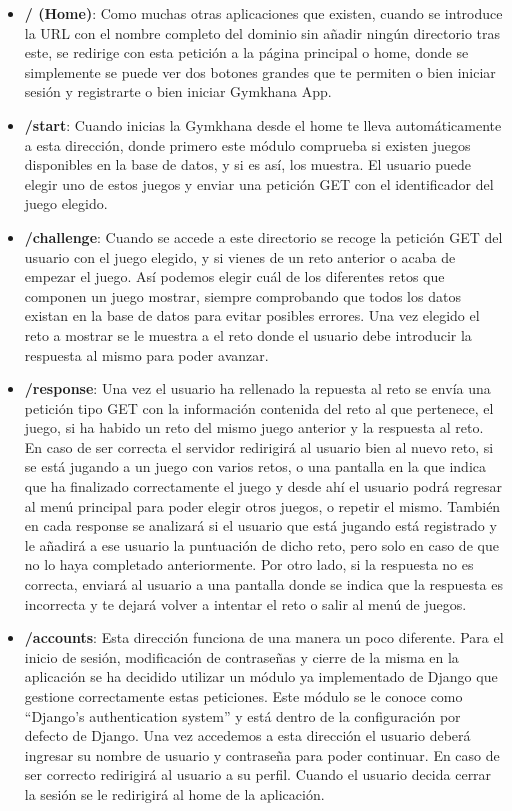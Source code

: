 \documentclass[a4paper, 12pt]{book}
\begin{document}
\begin{itemize}
	\item \textbf {/ (Home)}: Como muchas otras aplicaciones que existen, cuando se introduce la URL con el nombre completo del dominio sin añadir ningún directorio tras este, se redirige con esta petición a la página principal o home, donde se simplemente se puede ver dos botones grandes que te permiten o bien iniciar sesión y registrarte o bien iniciar Gymkhana App. 
	\item \textbf {/start}: Cuando inicias la Gymkhana desde el home te lleva automáticamente a esta dirección, donde primero este módulo comprueba si existen juegos disponibles en la base de datos, y si es así, los muestra. El usuario puede elegir uno de estos juegos y enviar una petición GET con el identificador del juego elegido. 
	\item \textbf {/challenge}: Cuando se accede a este directorio se recoge la petición GET del usuario con el juego elegido, y si vienes de un reto anterior o acaba de empezar el juego. Así podemos elegir cuál de los diferentes retos que componen un juego mostrar, siempre comprobando que todos los datos existan en la base de datos para evitar posibles errores. Una vez elegido el reto a mostrar se le muestra a el reto donde el usuario debe introducir la respuesta al mismo para poder avanzar. 
	\item \textbf {/response}: Una vez el usuario ha rellenado la repuesta al reto se envía una petición tipo GET con la información contenida del reto al que pertenece, el juego, si ha habido un reto del mismo juego anterior y la respuesta al reto. En caso de ser correcta el servidor redirigirá al usuario bien al nuevo reto, si se está jugando a un juego con varios retos, o una pantalla en la que indica que ha finalizado correctamente el juego y desde ahí el usuario podrá regresar al menú principal para poder elegir otros juegos, o repetir el mismo. También en cada response se analizará si el usuario que está jugando está registrado y le añadirá a ese usuario la puntuación de dicho reto, pero solo en caso de que no lo haya completado anteriormente. Por otro lado, si la respuesta no es correcta, enviará al usuario a una pantalla donde se indica que la respuesta es incorrecta y te dejará volver a intentar el reto o salir al menú de juegos.
	\item \textbf {/accounts}: Esta dirección funciona de una manera un poco diferente. Para el inicio de sesión, modificación de contraseñas y cierre de la misma en la aplicación se ha decidido utilizar un módulo ya implementado de Django que gestione correctamente estas peticiones. Este módulo se le conoce como ``Django’s authentication system'' y está dentro de la configuración por defecto de Django. Una vez accedemos a esta dirección el usuario deberá ingresar su nombre de usuario y contraseña para poder continuar. En caso de ser correcto redirigirá al usuario a su perfil. Cuando el usuario decida cerrar la sesión se le redirigirá al home de la aplicación. 

\end{itemize}
\end{document}

